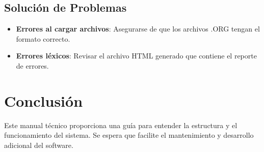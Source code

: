 \documentclass[12pt, letterpaper, twosite]{article}
\begin{document}
\subsection{Solución de Problemas}
\begin{itemize}
    \item \textbf{Errores al cargar archivos}: Asegurarse de que los archivos .ORG tengan el formato correcto.
    \item \textbf{Errores léxicos}: Revisar el archivo HTML generado que contiene el reporte de errores.
\end{itemize}

\section{Conclusión}
Este manual técnico proporciona una guía para entender la estructura y el funcionamiento del sistema. Se espera que facilite el mantenimiento y desarrollo adicional del software.
\end{document}
